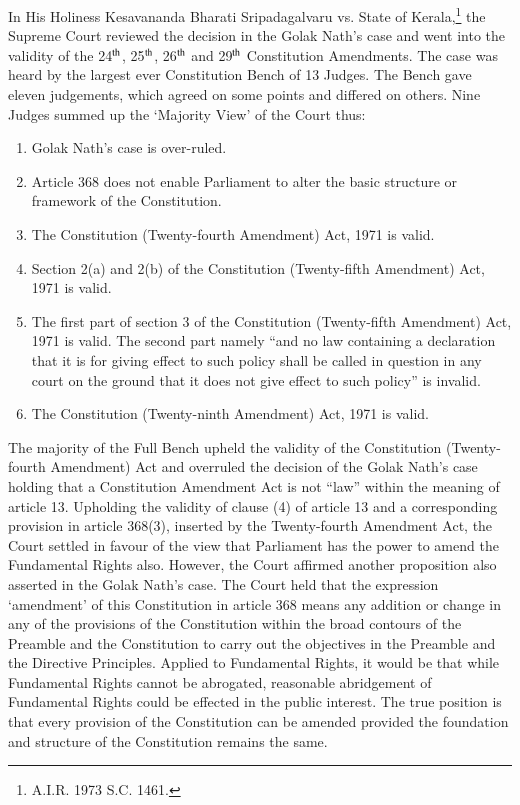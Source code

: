 \begin{multicols}{2}
\noi
In His Holiness Kesavananda Bharati Sripadagalvaru vs. State of Kerala,\footnote{A.I.R. 1973 S.C. 1461.} the Supreme Court
reviewed the decision in the Golak Nath’s case and went into the validity of the 24$^{\rm th}$, 25$^{\rm th}$, 26$^{\rm th}$
and 29$^{\rm th}$ Constitution Amendments. The case was heard by the largest ever Constitution Bench
of 13 Judges. The Bench gave eleven judgements, which agreed on some points and differed
on others. Nine Judges summed up the ‘Majority View’ of the Court thus:

\vspace{-.4cm}

\begin{enumerate}
\itemsep=0pt
\item Golak Nath’s case is over-ruled.

\item Article 368 does not enable Parliament to alter the basic structure or framework of the Constitution. 

\item The Constitution (Twenty-fourth Amendment) Act, 1971 is valid.

\item Section 2(a) and 2(b) of the Constitution (Twenty-fifth Amendment) Act, 1971 is valid.

\item The first part of section 3 of the Constitution (Twenty-fifth Amendment) Act, 1971 is
valid. The second part namely “and no law containing a declaration that it is for giving effect
to such policy shall be called in question in any court on the ground that it does not give effect
to such policy” is invalid.

\item The Constitution (Twenty-ninth Amendment) Act, 1971 is valid.
\end{enumerate}

\noi
The majority of the Full Bench upheld the validity of the Constitution (Twenty-fourth
Amendment) Act and overruled the decision of the Golak Nath’s case holding that a
Constitution Amendment Act is not “law” within the meaning of article 13. Upholding the
validity of clause (4) of article 13 and a corresponding provision in article 368(3), inserted by
the Twenty-fourth Amendment Act, the Court settled in favour of the view that Parliament
has the power to amend the Fundamental Rights also. However, the Court affirmed another
proposition also asserted in the Golak Nath’s case. The Court held that the expression
‘amendment’ of this Constitution in article 368 means any addition or change in any of the
provisions of the Constitution within the broad contours of the Preamble and the Constitution
to carry out the objectives in the Preamble and the Directive Principles. Applied to
Fundamental Rights, it would be that while Fundamental Rights cannot be abrogated,
reasonable abridgement of Fundamental Rights could be effected in the public interest. The
true position is that every provision of the Constitution can be amended provided the
foundation and structure of the Constitution remains the same.


\end{multicols}
